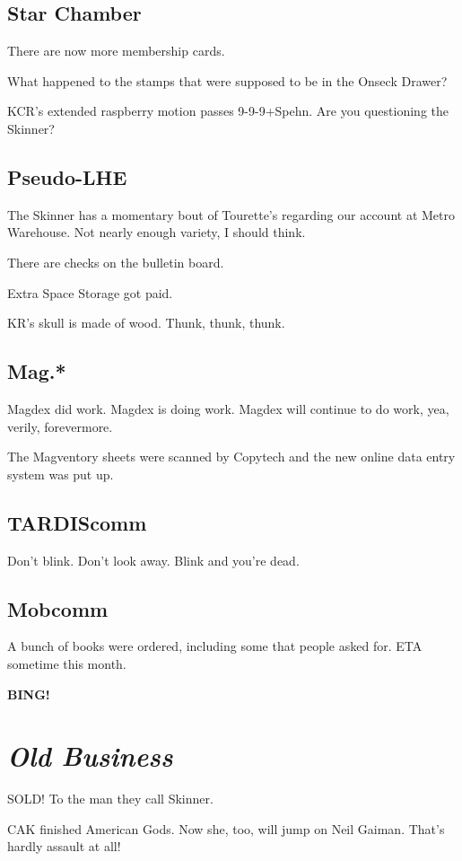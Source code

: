 \documentclass[10pt]{article}
\newcommand{\bing}{{\bf BING!} }
\newcommand{\goto}[1]{\bing \vskip 12pt \section*{{\em{#1}}}}
\begin{document}
\subsection*{Star Chamber}

There are now more membership cards.

What happened to the stamps that were supposed to be in the Onseck
Drawer?

KCR's extended raspberry motion passes 9-9-9+Spehn.  Are you
questioning the Skinner?

\subsection*{Pseudo-LHE}

The Skinner has a momentary bout of Tourette's regarding our account
at Metro Warehouse.  Not nearly enough variety, I should think.

There are checks on the bulletin board.

Extra Space Storage got paid.

KR's skull is made of wood.  Thunk, thunk, thunk.

\subsection*{Mag.*}

Magdex did work.  Magdex is doing work.  Magdex will continue to do
work, yea, verily, forevermore.

The Magventory sheets were scanned by Copytech and the new online data
entry system was put up.

\subsection*{TARDIScomm}

Don't blink.  Don't look away.  Blink and you're dead.

\subsection*{Mobcomm}

A bunch of books were ordered, including some that people asked for.
ETA sometime this month.

\goto{Old Business}

SOLD!  To the man they call Skinner.

CAK finished American Gods.  Now she, too, will jump on Neil Gaiman.
That's hardly assault at all!
\end{document}
